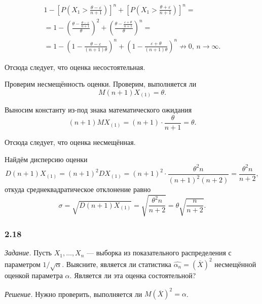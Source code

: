 \begin{enumerate}[label=\alph*)]
\begin{equation*}
\begin{split}
      1 - \left[ P \left( X_1 > \frac{ \theta - \varepsilon }{n + 1} \right) \right]^n +
      \left[ P \left( X_1 > \frac{ \theta + \varepsilon}{n + 1} \right) \right]^n = \\
      = 1 - \left( \frac{ \theta - \frac{ \theta - \varepsilon }{n + 1}}{ \theta } \right)^2 +
      \left( \frac{ \theta - \frac{ \varepsilon + \theta }{ n + 1}}{ \theta } \right)^n = \\
      = 1 - \left( 1 - \frac{ \theta - \varepsilon }{ \left( n + 1 \right) \theta } \right)^n +
      \left( 1 - \frac{ \varepsilon + \theta }{ \left( n + 1 \right) \theta } \right)^n \not \to
      0, \, n \to \infty.
    \end{split}
  \end{equation*}

  Отсюда следует, что оценка несостоятельная.

  Проверим несмещённость оценки.
  Проверим, выполняется ли
  $$M \left( n + 1 \right) X_{ \left( 1 \right) } =
    \theta.$$

  Выносим константу из-под знака математического ожидания
  $$ \left( n + 1 \right) MX_{ \left( 1 \right) } =
    \left( n + 1 \right) \cdot \frac{ \theta }{n + 1} =
    \theta.$$

  Отсюда следует, что оценка несмещённая.

  Найдём дисперсию оценки
  $$D \left( n + 1 \right) X_{ \left( 1 \right) } =
    \left( n + 1 \right)^2 DX_{ \left( 1 \right) } =
    \left( n + 1 \right)^2 \cdot \frac{ \theta^2 n}{ \left( n + 1 \right)^2 \left( n + 2 \right) } =
    \frac{ \theta^2 n}{n + 2},$$
  откуда среднеквадратическое отклонение равно
  $$ \sigma =
    \sqrt{D \left( n + 1 \right) X_{ \left( 1 \right) }} =
    \sqrt{ \frac{ \theta^2 n}{n + 2}} =
    \theta \sqrt{ \frac{n}{n + 2}}.$$
\end{enumerate}

\subsubsection*{2.18}

\textit{Задание.}
Пусть $X_1, \dotsc, X_n$ ---
выборка из показательного распределения с параметром $1 / \sqrt{ \alpha }$.
Выясните,
является ли статистика $ \hat{ \alpha_n} = \left( \overline{X} \right)^2$
несмещённой оценкой параметра $ \alpha $.
Является ли эта оценка состоятельной?

\textit{Решение.} Нужно проверить, выполняется ли $M \left( \overline{X} \right)^2 = \alpha $.

